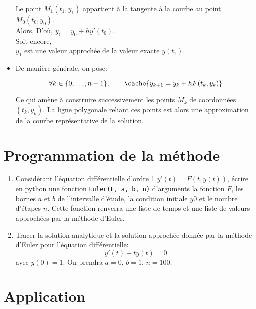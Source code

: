\begin{itemize}
\begin{minipage}{0.5\linewidth}
		Le point $M_1(t_1,y_1)$ appartient à la tangente à la courbe au point $M_0(t_0,y_0)$.\\
		Alors, 
		D'où, $y_1=y_0+hy'(t_0)$.\\
		Soit encore, \\
		$y_1$ est une valeur approchée de la valeur exacte $y(t_1)$.
		
	\end{minipage}
	
	
	
	\item De manière générale, on pose:
	\begin{framed}\[\forall k\in\{0,\dots,n-1\},\qquad \cache{y_{k+1}=y_k+hF(t_k,y_k)}\]\end{framed}
	
	Ce qui amène à construire successivement les points $M_k$ de coordonnées $(t_k,y_k)$. La ligne polygonale reliant ces points est alors une approximation de la courbe représentative de la solution.
	
\end{itemize}

\eject \section{Programmation de la méthode }

\begin{enumerate}
	
	\item Considérant l'équation différentielle d'ordre 1 $y'(t)=F(t,y(t))$, écrire en python une fonction \texttt{Euler(F, a, b, n)} d'arguments la fonction $F$, les bornes $a$ et $b$ de l'intervalle d'étude, la condition initiale $y0$ et le nombre d'étapes $n$. Cette fonction renverra une liste de temps et une liste de valeurs approchées par la méthode d'Euler.
	
	\item Tracer la solution analytique et la solution approchée donnée par la méthode d'Euler pour l'équation différentielle:$$y'(t)+ty(t)=0$$ avec $y(0)=1$. On prendra $a=0$, $b=1$, $n=100$.
	
\end{enumerate}

\section{Application}

